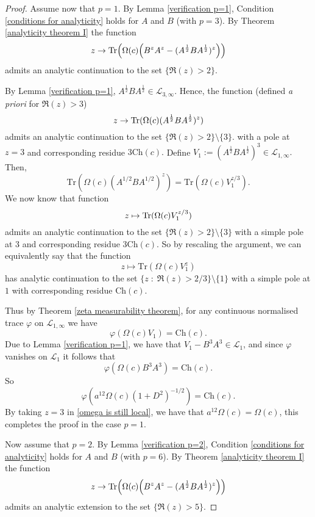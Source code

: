\begin{proof}
        Assume now that $p=1.$ By Lemma \ref{verification p=1}, Condition \ref{conditions for analyticity} holds for $A$ and $B$ (with $p=3$). By Theorem \ref{analyticity theorem I} the function
        $$z\to{\rm Tr}\Big(\Omega(c)\Big(B^zA^z-(A^{\frac12}BA^{\frac12})^z\Big)\Big)$$
        admits an analytic continuation to the set $\{\Re(z)>2\}.$
        
        By Lemma \ref{verification p=1}, $A^{\frac12}BA^{\frac12}\in\mathcal{L}_{3,\infty}.$ Hence, the function (defined {\it a priori} for $\Re(z)>3$)
        $$z\to{\rm Tr}(\Omega(c)(A^{\frac12}BA^{\frac12})^z)$$
        admits an analytic continuation to the set $\{\Re(z)>2\}\setminus \{3\}.$ with a pole at $z=3$ and corresponding residue $3\mathrm{Ch}(c).$ 
        Define $V_1:=(A^{\frac12}BA^{\frac12})^3\in\mathcal{L}_{1,\infty}.$ 
        Then,
        \begin{equation*}
            \mathrm{Tr}(\Omega(c)(A^{1/2}BA^{1/2})^{z}) = \mathrm{Tr}(\Omega(c)V_1^{z/3}).
        \end{equation*}
        We now know that function
        $$z\mapsto{\rm Tr}(\Omega(c)V_1^{z/3})$$
        admits an analytic continuation to the set $\{\Re(z)>2\}\setminus \{3\}$ with a simple pole at $3$ and corresponding residue $3\mathrm{Ch}(c)$. So by rescaling the argument, 
        we can equivalently say that the function $$z\mapsto \mathrm{Tr}(\Omega(c)V_1^z)$$ has analytic continuation to the set $\{z\;:\;\Re(z) > 2/3\}\setminus \{1\}$ with a simple
        pole at $1$ with corresponding residue $\mathrm{Ch}(c)$.
        
        Thus by Theorem \ref{zeta measurability theorem}, for any continuous normalised trace $\varphi$ on $\mathcal{L}_{1,\infty}$ we have
        \begin{equation*}
            \varphi(\Omega(c)V_1) = \mathrm{Ch}(c).
        \end{equation*}
        Due to Lemma \ref{verification p=1}, we have that $V_1-B^3A^3 \in \mathcal{L}_1$, and since $\varphi$ vanishes on $\mathcal{L}_1$ it follows that
        \begin{equation*}
            \varphi(\Omega(c)B^3A^3) =\mathrm{Ch}(c).
        \end{equation*}
        So
        $$\varphi(a^{12}\Omega(c)(1+D^2)^{-1/2}) = \mathrm{Ch}(c).$$
        By taking $z = 3$ in \eqref{omega is still local}, we have that $a^{12}\Omega(c) = \Omega(c)$, this completes the proof in the case $p=1$.
        
        Now assume that $p=2$.      
        By Lemma \ref{verification p=2}, Condition \ref{conditions for analyticity} holds for $A$ and $B$ (with $p=6$). 
        By Theorem \ref{analyticity theorem I} the function
        $$z\to{\rm Tr}\Big(\Omega(c)\Big(B^zA^z-(A^{\frac12}BA^{\frac12})^z\Big)\Big)$$
        admits an analytic extension to the set $\{\Re(z)>5\}.$


\end{proof}
